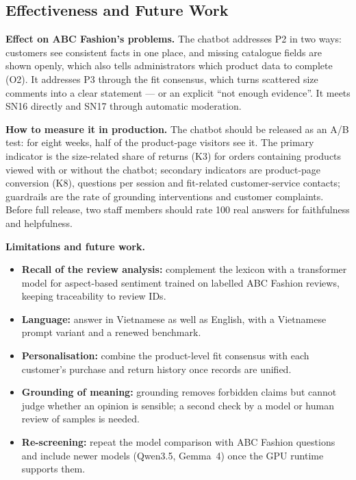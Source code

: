 \subsection{Effectiveness and Future Work}
\label{sec:discussion}
\textbf{Effect on ABC Fashion's problems.} The chatbot addresses P2 in two ways: customers see consistent facts in one place, and missing catalogue fields are shown openly, which also tells administrators which product data to complete (O2). It addresses P3 through the fit consensus, which turns scattered size comments into a clear statement --- or an explicit ``not enough evidence''. It meets SN16 directly and SN17 through automatic moderation.

\textbf{How to measure it in production.} The chatbot should be released as an A/B test: for eight weeks, half of the product-page visitors see it. The primary indicator is the size-related share of returns (K3) for orders containing products viewed with or without the chatbot; secondary indicators are product-page conversion (K8), questions per session and fit-related customer-service contacts; guardrails are the rate of grounding interventions and customer complaints. Before full release, two staff members should rate 100 real answers for faithfulness and helpfulness.

\textbf{Limitations and future work.}
\begin{itemize}
  \item \textbf{Recall of the review analysis:} complement the lexicon with a transformer model for aspect-based sentiment trained on labelled ABC Fashion reviews, keeping traceability to review IDs.
  \item \textbf{Language:} answer in Vietnamese as well as English, with a Vietnamese prompt variant and a renewed benchmark.
  \item \textbf{Personalisation:} combine the product-level fit consensus with each customer's purchase and return history once records are unified.
  \item \textbf{Grounding of meaning:} grounding removes forbidden claims but cannot judge whether an opinion is sensible; a second check by a model or human review of samples is needed.
  \item \textbf{Re-screening:} repeat the model comparison with ABC Fashion questions and include newer models (Qwen3.5, Gemma~4) once the GPU runtime supports them.
\end{itemize}

